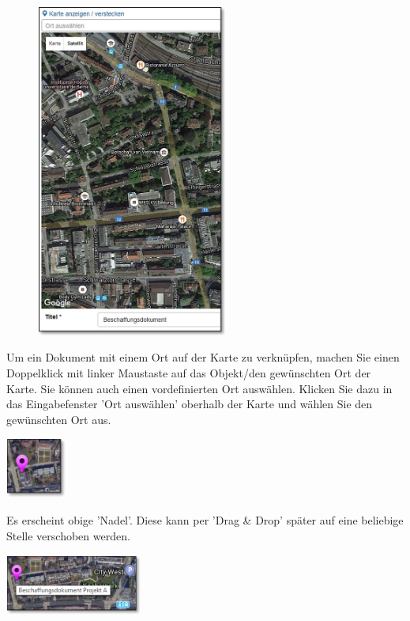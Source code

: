 \vspace{2mm}

\begin{figure}
\vspace{-15pt}
\includegraphics[height=110mm]{../chapters/11_Dokumentenablage/pictures/11-2-3_GoogleMap.jpg}
\end{figure}

Um ein Dokument mit einem Ort auf der Karte zu verknüpfen, machen Sie einen Doppelklick mit linker Maustaste auf das Objekt/den gewünschten Ort der Karte. Sie können auch einen vordefinierten Ort auswählen. Klicken Sie dazu in das Eingabefenster 'Ort auswählen' oberhalb der Karte und wählen Sie den gewünschten Ort aus.

\vspace{3mm}

\hspace{15mm} \includegraphics[height=20mm]{../chapters/11_Dokumentenablage/pictures/11-2-3_GoogleMapNadel.jpg}

Es erscheint obige 'Nadel'. Diese kann per 'Drag \& Drop' später auf eine beliebige Stelle verschoben werden.

\hspace{15mm} \includegraphics[height=20mm]{../chapters/11_Dokumentenablage/pictures/11-2-3_GoogleMapText.jpg}

